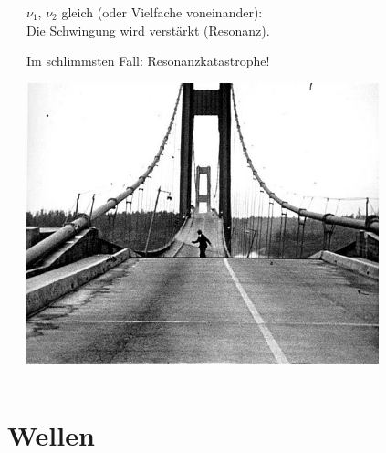 \documentclass{beamer}
\begin{document}
\begin{frame}
\begin{columns}[c]
\begin{column}{3cm}
\end{column}

\begin{column}{7cm}


\(\nu_1\), \(\nu_2\) gleich (oder Vielfache voneinander): \\
Die Schwingung wird verstärkt (Resonanz). \\[0.5 cm]

\pause

Im schlimmsten Fall: Resonanzkatastrophe!

\begin{center}
\includegraphics[width=0.8\textwidth]{tacoma_bridge.jpg}
\end{center}

\end{column}

\end{columns}

\end{frame}







\section{Wellen}



\begin{frame}
\end{frame}
\end{document}
